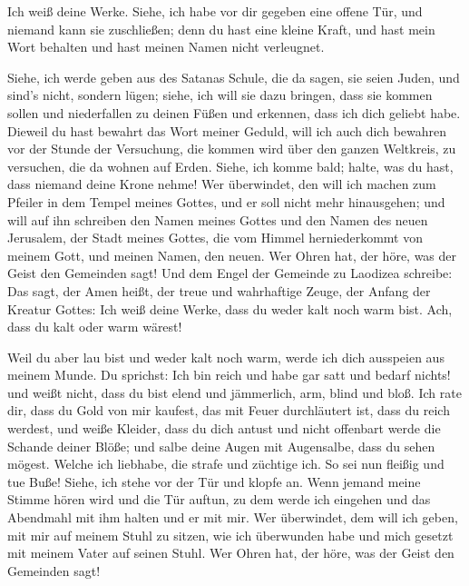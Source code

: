  Ich weiß deine Werke. Siehe, ich habe vor dir gegeben
eine offene Tür, und niemand kann sie zuschließen; denn du hast eine
kleine Kraft, und hast mein Wort behalten und hast meinen Namen nicht
verleugnet.

 Siehe, ich werde geben aus des Satanas Schule, die da
sagen, sie seien Juden, und sind's nicht, sondern lügen; siehe, ich will
sie dazu bringen, dass sie kommen sollen und niederfallen zu deinen
Füßen und erkennen, dass ich dich geliebt habe.  Dieweil
du hast bewahrt das Wort meiner Geduld, will ich auch dich bewahren vor
der Stunde der Versuchung, die kommen wird über den ganzen Weltkreis, zu
versuchen, die da wohnen auf Erden.  Siehe, ich komme
bald; halte, was du hast, dass niemand deine Krone nehme!
 Wer überwindet, den will ich machen zum Pfeiler in dem
Tempel meines Gottes, und er soll nicht mehr hinausgehen; und will auf
ihn schreiben den Namen meines Gottes und den Namen des neuen Jerusalem,
der Stadt meines Gottes, die vom Himmel herniederkommt von meinem Gott,
und meinen Namen, den neuen.  Wer Ohren hat, der höre,
was der Geist den Gemeinden sagt!  Und dem Engel der
Gemeinde zu Laodizea schreibe: Das sagt, der Amen heißt, der treue und
wahrhaftige Zeuge, der Anfang der Kreatur Gottes:  Ich
weiß deine Werke, dass du weder kalt noch warm bist. Ach, dass du kalt
oder warm wärest!

 Weil du aber lau bist und weder kalt noch warm, werde
ich dich ausspeien aus meinem Munde.  Du sprichst: Ich
bin reich und habe gar satt und bedarf nichts! und weißt nicht, dass du
bist elend und jämmerlich, arm, blind und bloß.  Ich rate
dir, dass du Gold von mir kaufest, das mit Feuer durchläutert ist, dass
du reich werdest, und weiße Kleider, dass du dich antust und nicht
offenbart werde die Schande deiner Blöße; und salbe deine Augen mit
Augensalbe, dass du sehen mögest.  Welche ich liebhabe,
die strafe und züchtige ich. So sei nun fleißig und tue Buße!
 Siehe, ich stehe vor der Tür und klopfe an. Wenn jemand
meine Stimme hören wird und die Tür auftun, zu dem werde ich eingehen
und das Abendmahl mit ihm halten und er mit mir.  Wer
überwindet, dem will ich geben, mit mir auf meinem Stuhl zu sitzen, wie
ich überwunden habe und mich gesetzt mit meinem Vater auf seinen Stuhl.
 Wer Ohren hat, der höre, was der Geist den Gemeinden
sagt!

